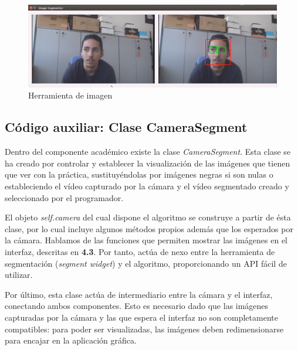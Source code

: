 \begin{figure}[H]
  \begin{center}
    \includegraphics[width=0.99\linewidth]{figures/imagetool.png}
		\caption{Herramienta de imagen}
		\label{fig.imagetool}
		\end{center}
\end{figure}

\subsection{Código auxiliar: Clase CameraSegment}
Dentro del componente académico existe la clase \textit{CameraSegment}. Esta clase se ha creado por controlar y establecer la visualización de las imágenes que tienen que ver con la práctica, sustituyéndolas por imágenes negras si son nulas o estableciendo el vídeo capturado por la cámara y el vídeo segmentado creado y seleccionado por el programador.

El objeto \textit{self.camera} del cual dispone el algoritmo se construye a partir de ésta clase, por lo cual incluye algunos métodos propios además que los esperados por la cámara. Hablamos de las funciones que permiten mostrar las imágenes en el interfaz, descritas en \textbf{4.3}. Por tanto, actúa de nexo entre la herramienta de segmentación (\textit{segment widget}) y el algoritmo, proporcionando un API fácil de utilizar.

Por último, esta clase actúa de intermediario entre la cámara y el interfaz, conectando ambos componentes. Esto es necesario dado que las imágenes capturadas por la cámara y las que espera el interfaz no son completamente compatibles: para poder ser visualizadas, las imágenes deben redimensionarse para encajar en la aplicación gráfica.

